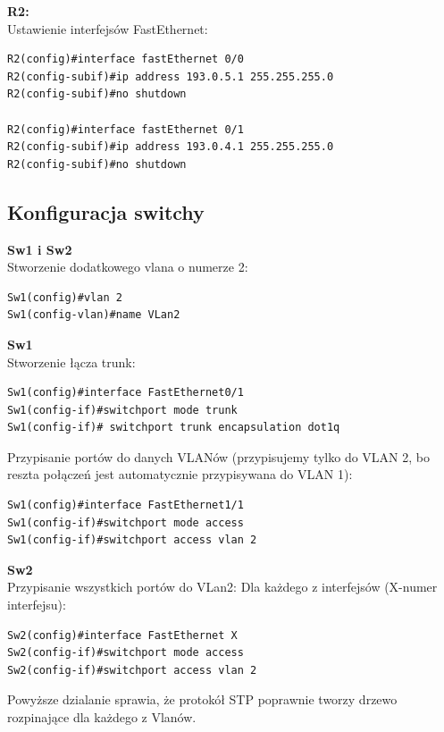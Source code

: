 \documentclass[11pt,a4paper]{article}
\begin{document}
\noindent
{\bf R2:}\\
Ustawienie interfejsów FastEthernet:
\begin{lstlisting}
R2(config)#interface fastEthernet 0/0
R2(config-subif)#ip address 193.0.5.1 255.255.255.0
R2(config-subif)#no shutdown

R2(config)#interface fastEthernet 0/1
R2(config-subif)#ip address 193.0.4.1 255.255.255.0
R2(config-subif)#no shutdown
\end{lstlisting}

\subsection{Konfiguracja switchy}
{\bf Sw1 i Sw2}\\
Stworzenie dodatkowego vlana o numerze 2:
\begin{lstlisting}
Sw1(config)#vlan 2
Sw1(config-vlan)#name VLan2
\end{lstlisting}
\noindent
{\bf Sw1}\\
Stworzenie łącza trunk:
\begin{lstlisting}
Sw1(config)#interface FastEthernet0/1
Sw1(config-if)#switchport mode trunk
Sw1(config-if)# switchport trunk encapsulation dot1q
\end{lstlisting}
Przypisanie portów do danych VLANów (przypisujemy tylko do VLAN 2, bo reszta połączeń jest automatycznie przypisywana do VLAN 1):
\begin{lstlisting}
Sw1(config)#interface FastEthernet1/1
Sw1(config-if)#switchport mode access
Sw1(config-if)#switchport access vlan 2
\end{lstlisting}

\noindent
{\bf Sw2}\\
Przypisanie wszystkich portów do VLan2:
Dla każdego z interfejsów (X-numer interfejsu):
\begin{lstlisting}
Sw2(config)#interface FastEthernet X
Sw2(config-if)#switchport mode access
Sw2(config-if)#switchport access vlan 2
\end{lstlisting}
Powyższe dzialanie sprawia, że protokół STP poprawnie tworzy drzewo rozpinające dla każdego z Vlanów.

\end{document}
